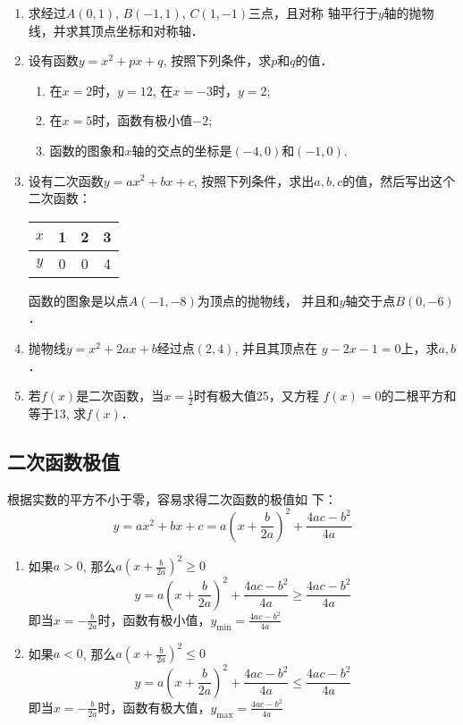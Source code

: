 \begin{ex}
\begin{enumerate}
\item 求经过$A(0,1)$, $B(-1,1)$, $C(1,-1)$三点，且对称
    轴平行于$y$轴的抛物线，并求其顶点坐标和对称轴．
    \item 设有函数$y=x^2+px+q$, 按照下列条件，求$p$和$q$的值．
    \begin{enumerate}
 \item 在$x=2$时，$y=12$, 在$x=-3$时，$y=2$;
    \item 在$x=5$时，函数有极小值$-2$;
    \item 函数的图象和$x$轴的交点的坐标是$(-4,0)$和$(-1,
    0)$.
    \end{enumerate}
   
    \item 设有二次函数$y=ax^2+bx+c$, 按照下列条件，求出$a,b,
    c$的值，然后写出这个二次函数：
    \begin{center}
        \begin{tabular}{c|ccc}
            \hline
$x$&1&2&3\\
            \hline
$y$&0&0&4\\
            \hline
        \end{tabular}
    \end{center}
    函数的图象是以点$A(-1,-8)$为顶点的抛物线，
   并且和$y$轴交于点$B(0,-6)$．

    \item 抛物线$y=x^2+2ax+b$经过点$(2,4)$, 并且其顶点在
    $y-2x-1=0$上，求$a,b$．
    \item 若$f(x)$是二次函数，当$x=\frac{1}{2}$时有极大值25，又方程
    $f(x)=0$的二根平方和等于13, 求$f(x)$．
\end{enumerate} 
\end{ex}

\subsection{二次函数极值}
根据实数的平方不小于零，容易求得二次函数的极值如
下：
\[y=ax^2+bx+c=a\left(x+\frac{b}{2a}\right)^2+\frac{4ac-b^2}{4a}\]
\begin{enumerate}
    \item 如果$a>0$, 那么$a\left(x+\frac{b}{2a}\right)^2\ge 0$
\[y=a\left(x+\frac{b}{2a}\right)^2+\frac{4ac-b^2}{4a}\ge \frac{4ac-b^2}{4a}\]
即当$x=-\frac{b}{2a}$时，函数有极小值，$y_{\min}=\frac{4ac-b^2}{4a}$

\item 如果$a<0$, 那么$a\left(x+\frac{b}{2a} \right)^2\le 0$
\[y=a\left(x+\frac{b}{2a}\right)^2+\frac{4ac-b^2}{4a}\le \frac{4ac-b^2}{4a}\]
即当$x=-\frac{b}{2a}$时，函数有极大值，$y_{\max}=\frac{4ac-b^2}{4a}$
\end{enumerate}

